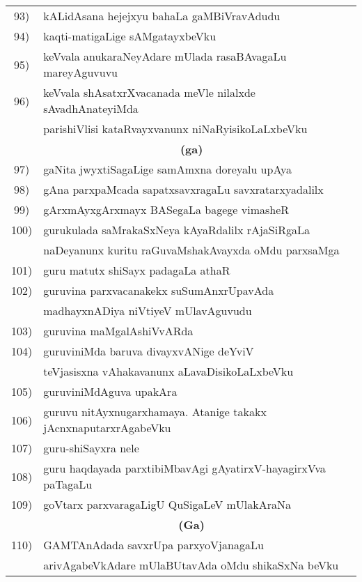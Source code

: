{\begin{longtable}{@{}cp{7.4cm}r}
93) & kALidAsana hejejxyu bahaLa gaMBiVravAdudu & \pageref{page243}\\
94) & kaqti-matigaLige sAMgatayxbeVku & \pageref{page123}\\
95) & keVvala anukaraNeyAdare mUlada rasaBAvagaLu mareyAguvuvu & \pageref{page141}\\
96) & keVvala shAsatxrXvacanada meVle nilalxde sAvadhAnateyiMda & \\
    & parishiVlisi kataRvayxvanunx niNaRyisikoLaLxbeVku & \pageref{page253}\\[0.3cm]
    & \multicolumn{1}{c}{\textbf{(ga)}} & \\[0.3cm]
97) & gaNita jwyxtiSagaLige samAmxna doreyalu upAya & \pageref{page51}\\
98) & gAna parxpaMcada sapatxsavxragaLu savxratarxyadalilx & \pageref{page121}\\
99) & gArxmAyxgArxmayx BASegaLa bagege vimasheR & \pageref{page6}\\
100) & gurukulada saMrakaSxNeya kAyaRdalilx rAjaSiRgaLa & \\
     & naDeyanunx kuritu raGuvaMshakAvayxda oMdu parxsaMga & \pageref{page232}\\
101) & guru matutx shiSayx padagaLa athaR & \pageref{page190}\\ 
102) & guruvina parxvacanakekx suSumAnxrUpavAda & \\
     & madhayxnADiya niVtiyeV mUlavAguvudu & \pageref{page101}\\
103) & guruvina maMgalAshiVvARda & \pageref{page75}\\
104) & guruviniMda baruva divayxvANige deYviV & \\
     & teVjasisxna vAhakavanunx aLavaDisikoLaLxbeVku & \pageref{page79}\\
105) & guruviniMdAguva upakAra & \pageref{page91}\\
106) & guruvu nitAyxnugarxhamaya. Atanige takakx jAcnxnaputarxrAgabeVku & \pageref{page74}\\
107) & guru-shiSayxra nele & \pageref{page66}\\
108) & guru haqdayada parxtibiMbavAgi gAyatirxV-hayagirxVva paTa\-gaLu & \pageref{page76}\\
109) & goVtarx parxvaragaLigU QuSigaLeV mUlakAraNa & \pageref{page139}\\[0.3cm]
     & \multicolumn{1}{c}{\textbf{(Ga)}} & \\[0.3cm]
110) &  GAMTAnAdada savxrUpa parxyoVjanagaLu & \\
     &  arivAgabeVkAdare mUlaBUtavAda oMdu shikaSxNa beVku &  \pageref{page169}\\

\end{longtable}}
